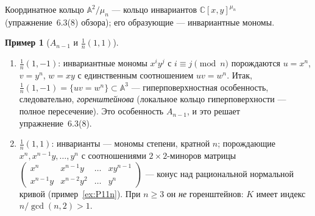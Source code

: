 \documentclass[11pt,a4paper]{article}
\theoremstyle{plain}
\theoremstyle{definition}
\newtheorem{example}[theorem]{Пример}
\theoremstyle{remark}
\renewcommand{\C}{\mathbb{C}}
\newcommand{\A}{\mathbb{A}}
\begin{document}
Координатное кольцо $\A^2/\mu_n$ --- кольцо инвариантов $\C[x,y]^{\mu_n}$ (упражнение~6.3(8)
обзора); его образующие --- инвариантные мономы.

\begin{example}[$A_{n-1}$ и $\frac1n(1,1)$]\label{ex:An-invariants}
\begin{enumerate}
\item $\frac1n(1,-1)$: инвариантные мономы $x^iy^j$ с $i\equiv j\pmod n$ порождаются
$u=x^n$, $v=y^n$, $w=xy$ с единственным соотношением $uv=w^n$. Итак,
$\frac1n(1,-1)=\{uv=w^n\}\subset\A^3$ --- гиперповерхностная особенность, следовательно,
\emph{горенштейнова} (локальное кольцо гиперповерхности --- полное пересечение). Это особенность
$A_{n-1}$, и это решает упражнение~6.3(8).
\item $\frac1n(1,1)$: инварианты --- мономы степени, кратной $n$; порождающие
$x^n,x^{n-1}y,\dots,y^n$ с соотношениями $2\times2$-миноров матрицы
$\begin{pmatrix}x^n&x^{n-1}y&\dots&xy^{n-1}\\x^{n-1}y&x^{n-2}y^2&\dots&y^n\end{pmatrix}$ ---
конус над рациональной нормальной кривой (пример~\ref{ex:P11n}). При $n\ge3$ он
\emph{не} горенштейнов: $K$ имеет индекс $n/\gcd(n,2)>1$.
\end{enumerate}
\end{example}
\end{document}
